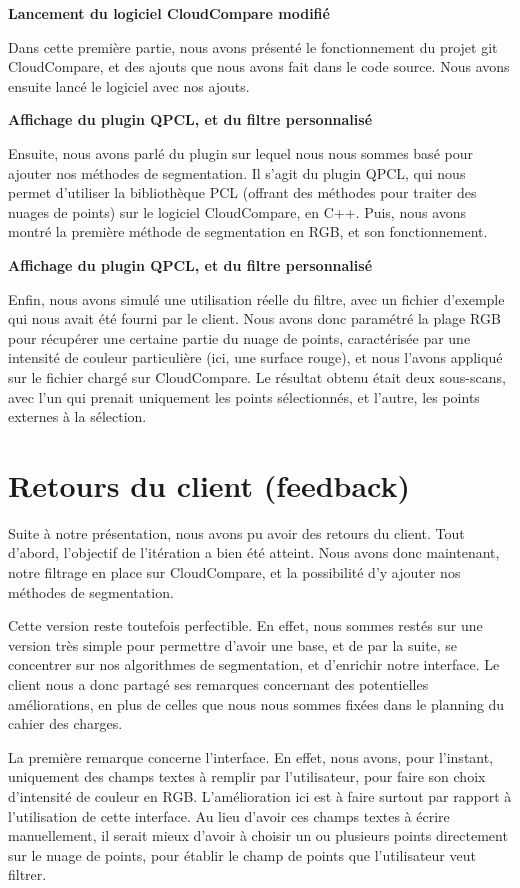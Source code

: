 \documentclass[12pt,titlepage,french]{article}
\begin{document}
\textbf{Lancement du logiciel CloudCompare modifié}

Dans cette première partie, nous avons présenté le fonctionnement du projet git CloudCompare, et des ajouts que nous avons fait dans le code source. Nous avons ensuite lancé le logiciel avec nos ajouts.

\textbf{Affichage du plugin QPCL, et du filtre personnalisé}

Ensuite, nous avons parlé du plugin sur lequel nous nous sommes basé pour ajouter nos méthodes de segmentation. Il s'agit du plugin QPCL, qui nous permet d'utiliser la bibliothèque PCL (offrant des méthodes pour traiter des nuages de points) sur le logiciel CloudCompare, en C++. Puis, nous avons montré la première méthode de segmentation en RGB, et son fonctionnement.

\textbf{Affichage du plugin QPCL, et du filtre personnalisé}

Enfin, nous avons simulé une utilisation réelle du filtre, avec un fichier d'exemple qui nous avait été fourni par le client. Nous avons donc paramétré la plage RGB pour récupérer une certaine partie du nuage de points, caractérisée par une intensité de couleur particulière (ici, une surface rouge), et nous l'avons appliqué sur le fichier chargé sur CloudCompare. Le résultat obtenu était deux sous-scans, avec l'un qui prenait uniquement les points sélectionnés, et l'autre, les points externes à la sélection.

\section{Retours du client (feedback)}

Suite à notre présentation, nous avons pu avoir des retours du client. Tout d'abord, l'objectif de l'itération a bien été atteint. Nous avons donc maintenant, notre filtrage en place sur CloudCompare, et la possibilité d'y ajouter nos méthodes de segmentation.

Cette version reste toutefois perfectible. En effet, nous sommes restés sur une version très simple pour permettre d'avoir une base, et de par la suite, se concentrer sur nos algorithmes de segmentation, et d'enrichir notre interface. Le client nous a donc partagé ses remarques concernant des potentielles améliorations, en plus de celles que nous nous sommes fixées dans le planning du cahier des charges.

La première remarque concerne l'interface. En effet, nous avons, pour l'instant, uniquement des champs textes à remplir par l'utilisateur, pour faire son choix d'intensité de couleur en RGB. L'amélioration ici est à faire surtout par rapport à l'utilisation de cette interface. Au lieu d'avoir ces champs textes à écrire manuellement, il serait mieux d'avoir à choisir un ou plusieurs points directement sur le nuage de points, pour établir le champ de points que l'utilisateur veut filtrer.
\end{document}
